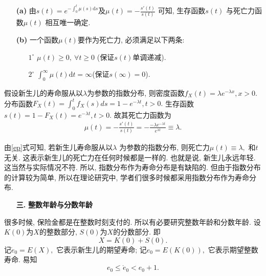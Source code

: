 \documentclass[a4paper,10pt]{ctexbook}
\newcommand{\hei}{\CJKfamily{hei}}      %
\begin{document}
\begin{remark}
    \begin{enumerate}
        \item[{\bf(a)}] 由$s(t) = e^{-\int_{0}^{t}\mu(s)\mathrm{d}s}$及$ \mu(t) = -\frac{s'(t)}{s(t)}$ 可知, 生存函数$s(t)$ 与死亡力函数$\mu(t)$ 相互唯一确定.
        \item[{\bf(b)}] 一个函数$\mu(t)$要作为死亡力, 必须满足以下两条:
            \begin{enumerate}
                \item[ $ 1^\circ$] $\mu(t) \geq 0, ~\forall t \geq 0$ (保证$s(t)$单调递减).
                \item[$2^\circ$] $\int_0^{\infty}\mu(t)\mathrm{d}t = \infty$(保证$s(\infty)=0$).
            \end{enumerate}
    \end{enumerate}

\end{remark}




\begin{example}
    假设新生儿的寿命服从以$\lambda$为参数的指数分布, 则密度函数$f_X(t)=\lambda e^{-\lambda x},x>0.$ 分布函数$F_X(t)=\int_0^t f_X(s)ds=1-e^{-\lambda t}, t>0.$ 生存函数$s(t)=1-F_X(t)=e^{-\lambda t},t>0.$  故其死亡力函数为
    \begin{align}\label{ep}
        \mu(t)=-\frac{s'(t)}{s(t)}=-\frac{-\lambda e^{-\lambda t}}{e^{\lambda t}}\equiv\lambda.
    \end{align}
\end{example}

\begin{remark}
    由\eqref{ep}式可知, 若新生儿寿命服从以$\lambda$ 为参数的指数分布, 则死亡力$\mu(t)\equiv \lambda,$ 和$t$无关. 这表示新生儿的死亡力在任何时候都是一样的. 也就是说, 新生儿永远年轻. 这当然与实际情况不符. 所以, 指数分布作为寿命分布是有缺陷的. 但由于指数分布的计算较为简单, 所以在理论研究中, 学者们很多时候都采用指数分布作为寿命分布.
\end{remark}
\begin{itemize}
    \item[{\bf\hei 三.}]{\hei\bf 整数年龄与分数年龄}
\end{itemize}
很多时候, 保险金都是在整数时刻支付的. 所以有必要研究整数年龄和分数年龄. 设$K(0)$为$X$的整数部分, $S(0)$为$X$的分数部分. 即
$$X = K(0) + S(0).$$
记$\mathring{e}_0 = E(X),$ 它表示新生儿的期望寿命; 记$e_0 = E(K(0)),$ 它表示期望整数寿命. 易知
\begin{equation*}
    e_0 \le \mathring{e}_0 < e_0 + 1.
\end{equation*}
\end{document}
